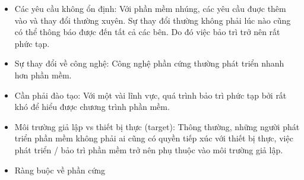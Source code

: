             \begin{itemize}
                \item Các yêu cầu không ổn định:
                    Với phần mềm nhúng, các yêu cầu đuợc thêm vào và thay đổi
                    thường xuyên. Sự thay đổi thường không phải lúc nào cũng
                    có thể thông báo được đến tất cả các bên. Do đó việc bảo trì
                    trở nên rất phức tạp.

                \item Sự thay đổi về công nghệ:
                    Công nghệ phần cứng thường phát triển nhanh hơn phần mềm.

                \item Cần phải đào tạo:
                    Với một vài lĩnh vực, quá trình bảo trì phức tạp bởi rất khó để
                    hiểu được chương trình phần mềm. 

                \item Môi trường giả lập vs thiết bị thực (target):
                    Thông thường, những người phát triển phần mềm không phải ai
                    cũng có quyền tiếp xúc với thiết bị thực, việc phát triển /
                    bảo trì
                    phần mềm trở nên phụ thuộc vào môi trường giả lập.

                \item Ràng buộc về phần cứng
            \end{itemize} 
        
                
